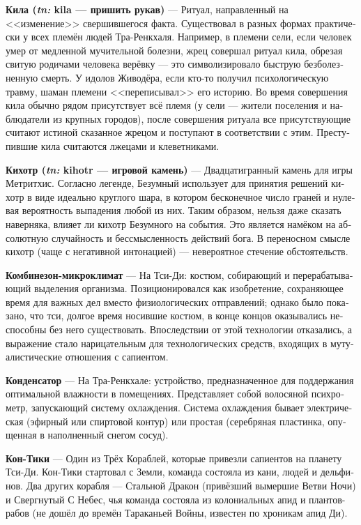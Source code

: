 \documentclass[a4paper,12pt,fleqn]{book}\usepackage{cooltooltips}\usepackage{polyglossia}\setdefaultlanguage[babelshorthands=true]{russian}\setotherlanguage{english}\defaultfontfeatures{Ligatures=TeX,Mapping=tex-text} \usepackage{xcolor}\definecolor{lightgray}{HTML}{bbbbbb}\color{lightgray}\newcommand{\ml}[3]{\textenglish{\textcolor{black}{#3}}}
\newcommand{\theterm}[3]{\textbf{\hypertarget{#1}{#2}} --- #3}
\newcommand{\theorigin}[3]{\textit{#1:} #2 --- #3}
\begin{document}
{\theterm{kila}
{Кила (\theorigin{tn}{kila}{пришить рукав})}
{Ритуал, направленный на <<изменение>> свершившегося факта.
Существовал в разных формах практически у всех племён людей Тра-Ренкхаля.
Например, в племени сели, если человек умер от медленной мучительной болезни, жрец совершал ритуал кила, обрезая свитую родичами человека верёвку --- это символизировало быструю безболезненную смерть.
У идолов Живодёра, если кто-то получил психологическую травму, шаман племени <<переписывал>> его историю.
Во время совершения кила обычно рядом присутствует всё племя (у сели --- жители поселения и наблюдатели из крупных городов), после совершения ритуала все присутствующие считают истиной сказанное жрецом и поступают в соответствии с этим.
Преступившие кила считаются лжецами и клеветниками.}

\theterm{kihotr}
{Кихотр (\theorigin{tn}{kihotr}{игровой камень})}
{Двадцатигранный камень для игры Метритхис.
Согласно легенде, Безумный использует для принятия решений кихотр в виде идеально круглого шара, в котором бесконечное число граней и нулевая вероятность выпадения любой из них.
Таким образом, нельзя даже сказать наверняка, влияет ли кихотр Безумного на события.
Это является намёком на абсолютную случайность и бессмысленность действий бога.
В переносном смысле кихотр (чаще с негативной интонацией) --- невероятное стечение обстоятельств.}

\theterm{microclimate-suit}
{Комбинезон-микроклимат}
{На Тси-Ди: костюм, собирающий и перерабатывающий выделения организма.
Позиционировался как изобретение, сохраняющее время для важных дел вместо физиологических отправлений;
однако было показано, что тси, долгое время носившие костюм, в конце концов оказывались неспособны без него существовать.
Впоследствии от этой технологии отказались, а выражение стало нарицательным для технологических средств, входящих в мутуалистические отношения с сапиентом.}

\theterm{condensor}
{Конденсатор}
{На Тра-Ренкхале: устройство, предназначенное для поддержания оптимальной влажности в помещениях.
Представляет собой волосяной психрометр, запускающий систему охлаждения.
Система охлаждения бывает электрическая (эфирный или спиртовой контур) или простая (серебряная пластинка, опущенная в наполненный снегом сосуд).}

\theterm{con-tici} %
{Кон-Тики}
{Один из Трёх Кораблей, которые привезли сапиентов на планету Тси-Ди.
Кон-Тики стартовал с Земли, команда состояла из кани, людей и дельфинов.
Два других корабля --- Стальной Дракон (привёзший вымершие Ветви Ночи) и Свергнутый С Небес, чья команда состояла из колониальных апид и плантов-рабов (не дошёл до времён Тараканьей Войны, известен по хроникам апид Ди).}

}
\end{document}
